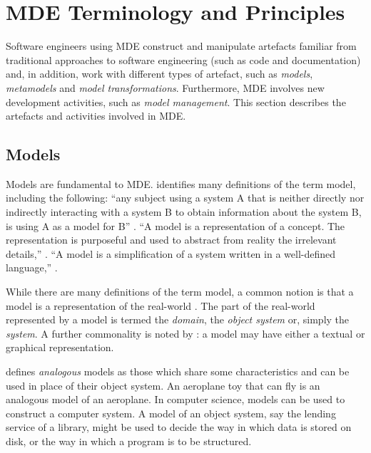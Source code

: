 
\section{MDE Terminology and Principles}
\label{sec:mde_terms}
Software engineers using MDE construct and manipulate artefacts familiar from traditional approaches to software engineering (such as code and documentation) and, in addition, work with different types of artefact, such as \emph{models}, \emph{metamodels} and \emph{model transformations}. Furthermore, MDE involves new development activities, such as \emph{model management}. This section describes the artefacts and activities involved in MDE.

\subsection{Models}
\label{subsec:models}
Models are fundamental to MDE. \cite{kurtev04thesis} identifies many definitions of the term model, including the following: ``any subject using a system A that is neither directly nor indirectly interacting with a system B to obtain information about the system B, is using A as a model for B'' \cite{apostel60models}. ``A model is a representation of a concept. The representation is purposeful and used to abstract from reality the irrelevant details,'' \cite{starfield90model}. ``A model is a simplification of a system written in a well-defined language,'' \cite{bezivin01definition}. 

While there are many definitions of the term model, a common notion is that a model is a representation of the real-world \cite[pg12]{kurtev04thesis}. The part of the real-world represented by a model is termed the \emph{domain}, the \emph{object system} or, simply the \emph{system}. A further commonality is noted by \cite{kolovos06eol}: a model may have either a textual or graphical representation.

\cite{ackoff62scientific} defines \emph{analogous} models as those which share some characteristics and can be used in place of their object system. An aeroplane toy that can fly is an analogous model of an aeroplane. In computer science, models can be used to construct a computer system. A model of an object system, say the lending service of a library, might be used to decide the way in which data is stored on disk, or the way in which a program is to be structured.

